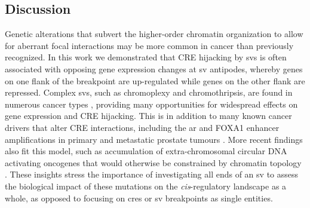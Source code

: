 \subsection{Discussion}

Genetic alterations that subvert the higher-order chromatin organization to allow for aberrant focal interactions may be more common in cancer than previously recognized.
In this work we demonstrated that CRE hijacking by \glspl{sv} is often associated with opposing gene expression changes at \gls{sv} antipodes, whereby genes on one flank of the breakpoint are up-regulated while genes on the other flank are repressed.
Complex \glspl{sv}, such as chromoplexy and chromothripsis, are found in numerous cancer types \cite{bacaPunctuatedEvolutionProstate2013,liPatternsSomaticStructural2020}, providing many opportunities for widespread effects on gene expression and CRE hijacking.
This is in addition to many known cancer drivers that alter CRE interactions, including the \gls{ar} and FOXA1 enhancer amplifications in primary and metastatic prostate tumours \cite{paroliaDistinctStructuralClasses2019,quigleyGenomicHallmarksStructural2018,takedaSomaticallyAcquiredEnhancer2018,zhouNoncodingMutationsTarget2020,kronTMPRSS2ERGFusion2017,viswanathanStructuralAlterationsDriving2018}.
More recent findings also fit this model, such as accumulation of extra-chromosomal circular DNA activating oncogenes that would otherwise be constrained by chromatin topology \cite{wuCircularEcDNAPromotes2019,kumarATACseqIdentifiesThousands2020,mortonFunctionalEnhancersShape2019,shoshaniChromothripsisDrivesEvolution2021}.
These insights stress the importance of investigating all ends of an \gls{sv} to assess the biological impact of these mutations on the \emph{cis}-regulatory landscape as a whole, as opposed to focusing on \glspl{cre} or \gls{sv} breakpoints as single entities.

